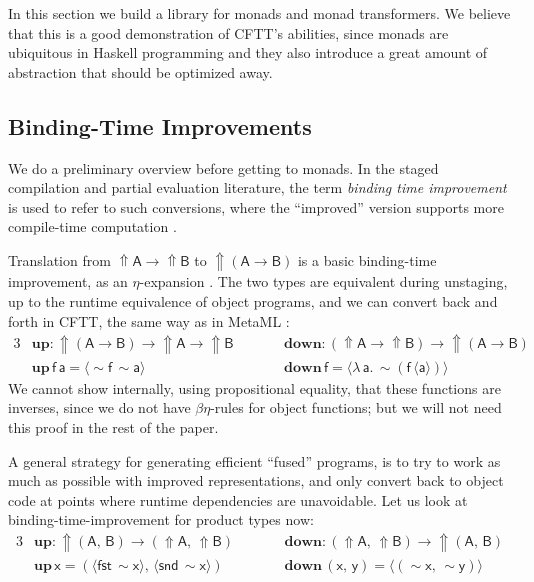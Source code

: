 \documentclass[acmsmall,screen]{acmart}
\newcommand{\msf}[1]{{\mathsf{#1}}}
\newcommand{\mbf}[1]{{\mathbf{#1}}}
\newcommand{\bs}[1]{\boldsymbol{#1}}
\newcommand{\ind}{\hspace{1em}}
\newcommand{\lam}{\lambda\,}
\newcommand{\vA}{\mathsf{A}}
\newcommand{\vB}{\mathsf{B}}
\newcommand{\va}{\mathsf{a}}
\newcommand{\vx}{\mathsf{x}}
\newcommand{\vy}{\mathsf{y}}
\newcommand{\vf}{\mathsf{f}}
\newcommand{\Up}{{\Uparrow}}
\newcommand{\spl}{{\bs{\sim}}}
\newcommand{\ql}{{\bs{\langle}}}
\newcommand{\qr}{{\bs{\rangle}}}
\newcommand{\fst}{\msf{fst}}
\newcommand{\snd}{\msf{snd}}
\theoremstyle{remark}
\newcommand{\mup}{\mbf{up}}
\newcommand{\mdown}{\mbf{down}}
\newcommand{\qt}[1]{\ql#1\qr}
\begin{document}
In this section we build a library for monads and monad transformers. We believe
that this is a good demonstration of CFTT's abilities, since monads are
ubiquitous in Haskell programming and they also introduce a great amount of
abstraction that should be optimized away.

\subsection{Binding-Time Improvements}\label{sec:binding-time-improvements}

We do a preliminary overview before getting to monads. In the staged compilation
and partial evaluation literature, the term \emph{binding time improvement} is
used to refer to such conversions, where the ``improved'' version supports more
compile-time computation \cite[Chapter 12]{partial-evaluation}.

Translation from $\Up \vA \to \Up \vB$ to $\Up(\vA \to \vB)$ is a basic
binding-time improvement, as an $\eta$-expansion \cite{eta-expansion-trick}. The
two types are equivalent during unstaging, up to the runtime equivalence of
object programs, and we can convert back and forth in CFTT, the same way as in
MetaML \cite[Section 9]{metaml}:
\begin{alignat*}{3}
  &\mup : \Up (\vA \to \vB) \to \Up \vA \to \Up \vB && \ind\ind \mdown : (\Up \vA \to \Up \vB) \to \Up (\vA \to \vB) \\
  &\mup\,\vf\,\va = \ql \spl \vf\, \spl \va\qr   && \ind\ind \mdown\,\vf = \ql \lam \va.\,\spl(\vf\,\ql \va \qr) \qr
\end{alignat*}
We cannot show internally, using propositional equality, that these functions are
inverses, since we do not have $\beta\eta$-rules for object functions; but we
will not need this proof in the rest of the paper.

 A general strategy for generating efficient ``fused''
programs, is to try to work as much as possible with improved representations,
and only convert back to object code at points where runtime dependencies are
unavoidable. Let us look at binding-time-improvement for product types now:
\begin{alignat*}{3}
  &\mup : \Up (\vA,\,\vB) \to (\Up \vA,\,\Up \vB) && \ind\ind \mdown : (\Up \vA,\,\Up \vB) \to \Up(\vA,\,\vB) \\
  &\mup\,\vx = (\qt{\fst\,\spl \vx},\, \qt{\snd\,\spl \vx})   && \ind\ind \mdown\,(\vx,\,\vy) = \qt{(\spl \vx,\,\spl \vy)}
\end{alignat*}
\end{document}
